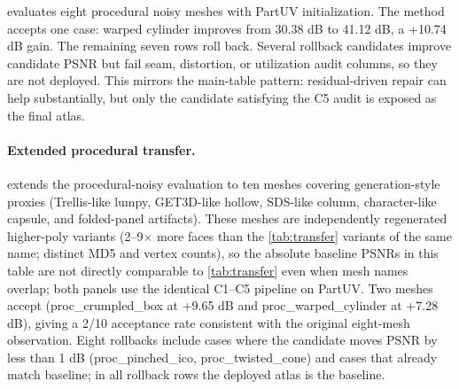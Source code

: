

 evaluates eight procedural noisy meshes with PartUV initialization. The method accepts one case: warped cylinder improves from 30.38 dB to 41.12 dB, a +10.74 dB gain. The remaining seven rows roll back. Several rollback candidates improve candidate PSNR but fail seam, distortion, or utilization audit columns, so they are not deployed. This mirrors the main-table pattern: residual-driven repair can help substantially, but only the candidate satisfying the C5 audit is exposed as the final atlas.

\paragraph*{Extended procedural transfer.}

 extends the procedural-noisy evaluation to ten meshes covering generation-style proxies (Trellis-like lumpy, GET3D-like hollow, SDS-like column, character-like capsule, and folded-panel artifacts). These meshes are independently regenerated higher-poly variants (2--9$\times$ more faces than the \cref{tab:transfer} variants of the same name; distinct MD5 and vertex counts), so the absolute baseline PSNRs in this table are not directly comparable to \cref{tab:transfer} even when mesh names overlap; both panels use the identical C1--C5 pipeline on PartUV. Two meshes accept (proc\_crumpled\_box at +9.65 dB and proc\_warped\_cylinder at +7.28 dB), giving a 2/10 acceptance rate consistent with the original eight-mesh observation. Eight rollbacks include cases where the candidate moves PSNR by less than 1 dB (proc\_pinched\_ico, proc\_twisted\_cone) and cases that already match baseline; in all rollback rows the deployed atlas is the baseline.

